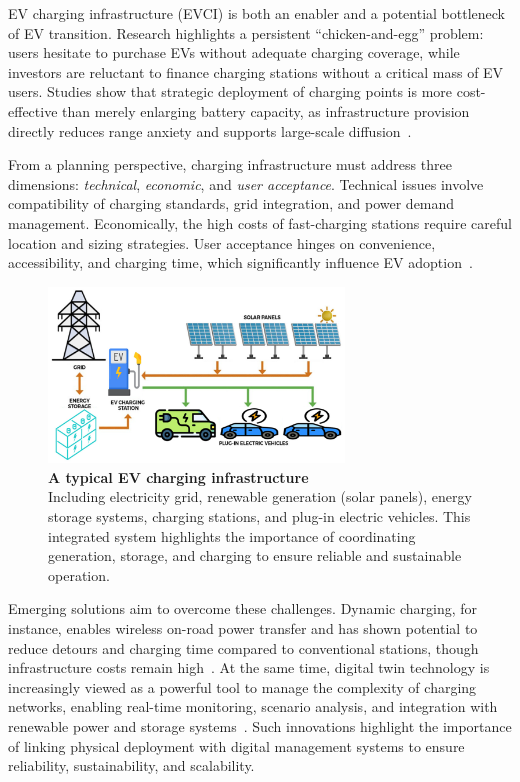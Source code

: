 EV charging infrastructure (EVCI) is both an enabler and a potential bottleneck of EV 
transition. Research highlights a persistent ``chicken-and-egg'' problem: users 
hesitate to purchase EVs without adequate charging coverage, while investors 
are reluctant to finance charging stations without a critical mass of EV users. 
Studies show that strategic deployment of charging points is more cost-effective 
than merely enlarging battery capacity, as infrastructure provision directly reduces 
range anxiety and supports large-scale diffusion~\cite{Metais2022}. 

From a planning perspective, charging infrastructure must address three 
dimensions: \emph{technical}, \emph{economic}, and \emph{user acceptance}. Technical 
issues involve compatibility of charging standards, grid integration, and power 
demand management. Economically, the high costs of fast-charging stations 
require careful location and sizing strategies. User acceptance hinges on 
convenience, accessibility, and charging time, which significantly influence EV 
adoption~\cite{LaMonaca2022}. 

\begin{figure}[ht!]
    \centering
    \includegraphics[width=0.7\textwidth]{Images/EVCI_diagram.png}
    \caption{\textbf{A typical EV charging infrastructure}~\cite{Deeum2023} \\Including electricity grid, 
    renewable generation (solar panels), energy storage systems, charging stations, 
    and plug-in electric vehicles. This integrated system highlights the importance of 
    coordinating generation, storage, and charging to ensure reliable and sustainable 
    operation.}
    \label{fig:EVCI_diagram}
\end{figure}

Emerging solutions aim to overcome these challenges. Dynamic charging, for 
instance, enables wireless on-road power transfer and has shown potential to 
reduce detours and charging time compared to conventional stations, though 
infrastructure costs remain high~\cite{Nguyen2024}. At the same time, digital twin 
technology is increasingly viewed as a powerful tool to manage the complexity 
of charging networks, enabling real-time monitoring, scenario analysis, and 
integration with renewable power and storage systems~\cite{Yu2024}. Such 
innovations highlight the importance of linking physical deployment with digital 
management systems to ensure reliability, sustainability, and scalability.

